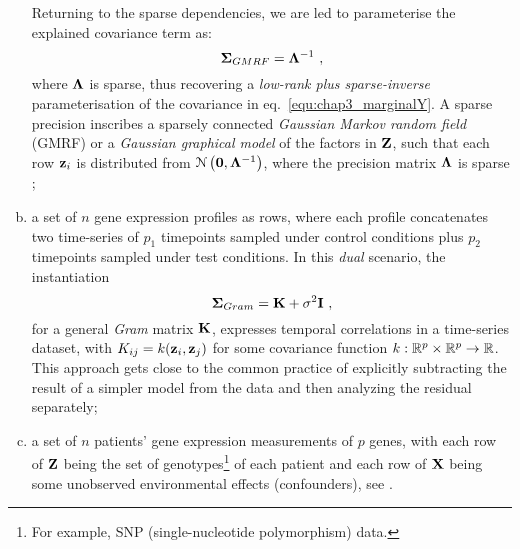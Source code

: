 \begin{enumerate}[(a)]
	  Returning to the sparse dependencies, we are led to parameterise the explained covariance term as:
	  \begin{equation} \label{equ:chap3_SigmaGL}
	    \mathbf{\Sigma}_{GMRF} = \mathbf{\Lambda}^{-1} ~,
	  \end{equation}
	  where $\mathbf{\Lambda}$ is sparse, thus recovering a \emph{low-rank plus sparse-inverse} parameterisation of the covariance in eq.~\eqref{equ:chap3_marginalY}. A sparse precision inscribes a sparsely connected \textit{Gaussian Markov random field} (GMRF) or a \textit{Gaussian graphical model} of the factors in $\mathbf{Z}$, such that each row $\mathbf{z}_i$ is distributed from $\mathcal{N} \left(  \mathbf{0} ,  \mathbf{\Lambda}^{-1}  \right)$, where the precision matrix $\mathbf{\Lambda}$ is sparse \citep{Lauritzen:graphical96};
	\item \label{item:scenario3}
	  a set of $n$ gene expression profiles as rows, where each profile concatenates two time-series of $p_1$ timepoints sampled under control conditions plus $p_2$ timepoints sampled under test conditions. In this \emph{dual} scenario, the instantiation
	  \begin{equation*}
	    \mathbf{\Sigma}_{Gram} = \mathbf{K} + \sigma^2\mathbf{I} ~,
	  \end{equation*}
	  for a general \textit{Gram} matrix $\mathbf{K}$, expresses temporal correlations in a time-series dataset, with $K_{ij}=k(\mathbf{z}_i,\mathbf{z}_j)$ for some covariance function $k:\mathbb{R}^p \times \mathbb{R}^p \rightarrow \mathbb{R}$. This approach gets close to the common practice of explicitly subtracting the result of a simpler model from the data and then analyzing the residual separately;
	\item \label{item:scenario4}
	  a set of $n$ patients' gene expression measurements of $p$ genes, with each row of $\mathbf{Z}$ being the set of genotypes\footnote{ For example, SNP (single-nucleotide polymorphism) data.} of each patient and each row of $\mathbf{X}$ being some unobserved environmental effects (confounders), see \citep{Fusi:genomics12}.
      \end{enumerate}

